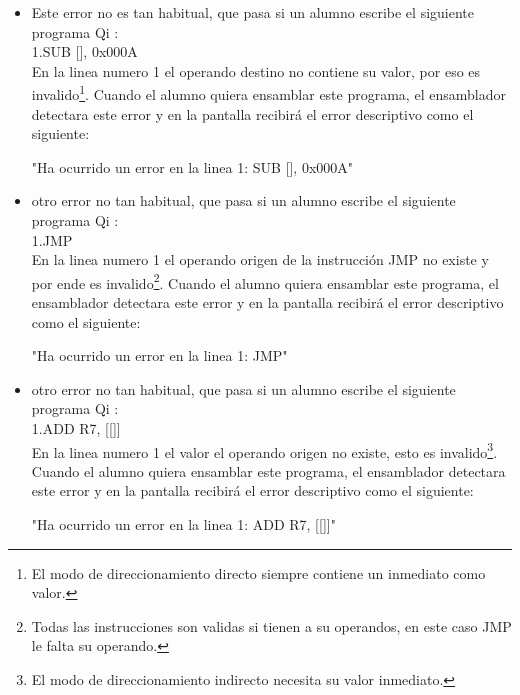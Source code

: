 \begin{itemize}
"Ha ocurrido un error en la linea 1: ZDD [0x900000000000], R4" \\

\item Este error no es tan habitual, que pasa si un alumno escribe el siguiente programa Qi  :\\

1.SUB [], 0x000A \\

En la linea numero 1 el operando destino no contiene su valor, por eso es invalido\footnote{El modo de direccionamiento directo siempre contiene un inmediato como valor.}. Cuando el alumno quiera ensamblar este programa, el ensamblador detectara este error y en la pantalla recibirá el error descriptivo como el siguiente:

"Ha ocurrido un error en la linea 1: SUB [], 0x000A" \\

\item otro error no tan habitual, que pasa si un alumno escribe el siguiente programa Qi  :\\

1.JMP \\

En la linea numero 1 el operando origen de la instrucción JMP no existe y por ende es invalido\footnote{Todas las instrucciones son validas si tienen a su operandos, en este caso JMP le falta su operando.}. Cuando el alumno quiera ensamblar este programa, el ensamblador detectara este error y en la pantalla recibirá el error descriptivo como el siguiente:

"Ha ocurrido un error en la linea 1: JMP" \\
 
\item otro error no tan habitual, que pasa si un alumno escribe el siguiente programa Qi  :\\

1.ADD R7, [[]] \\

En la linea numero 1 el valor el operando origen no existe, esto es invalido\footnote{El modo de direccionamiento indirecto necesita su valor inmediato.}. Cuando el alumno quiera ensamblar este programa, el ensamblador detectara este error y en la pantalla recibirá el error descriptivo como el siguiente:

"Ha ocurrido un error en la linea 1: ADD R7, [[]]" \\

\end{itemize}

